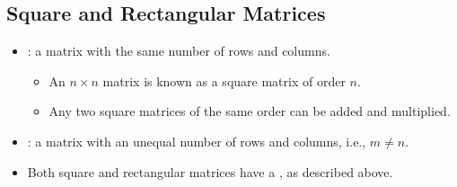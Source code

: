 \begin{itemize}
  \subsection{Square and Rectangular Matrices}\label{Square and Rectangular Matrices}
  \begin{itemize}
    \item {}: a matrix with the same number of rows and columns. 
      \begin{itemize}
        \item An \(n\times n\) matrix is known as a square matrix of order \(n\).
        \item Any two square matrices of the same order can be added and multiplied.
      \end{itemize}
    \item {}: a matrix with an unequal number of rows and columns, i.e., \(m \neq n\). 
    \item Both square and rectangular matrices have a \hyperref[Diagonal]{}, as described above.
  \end{itemize}


\end{itemize}
